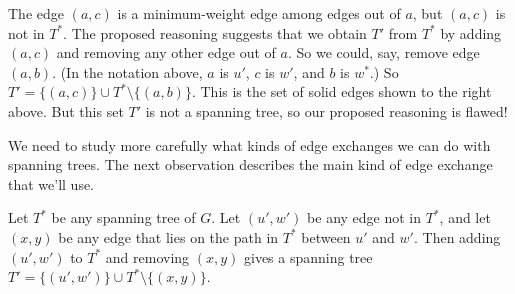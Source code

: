 The edge $(a, c)$ is a minimum-weight edge among edges out of $a$, but $(a,c)$ is not in $T^*$.
The proposed reasoning suggests that we obtain $T'$ from $T^*$
by adding $(a, c)$ and removing any other edge out of $a$.
So we could, say, remove edge $(a, b)$.
(In the notation above, $a$ is $u'$, $c$ is $w'$, and $b$ is $w^*$.)
So $T'=\{(a,c)\}\cup T^* \setminus \{(a, b)\}$.
This is the set of solid edges shown to the right above.
But this set $T'$ is not a spanning tree,
so our proposed reasoning is flawed!

We need to study more carefully what kinds of edge exchanges we can do with spanning trees.
The next observation describes the main kind of edge exchange that we'll use.

\begin{observation}\label{greedy: exchange}
  Let $T^*$ be any spanning tree of $G$.
  Let $(u',w')$ be any edge not in $T^*$,
  and let $(x, y)$ be any edge that lies on the path in $T^*$ between $u'$ and $w'$.
  Then adding $(u', w')$ to $T^*$ and removing $(x, y)$
  gives a spanning tree $T'=\{(u', w')\}\cup T^* \setminus \{(x, y)\}$.
\end{observation}

